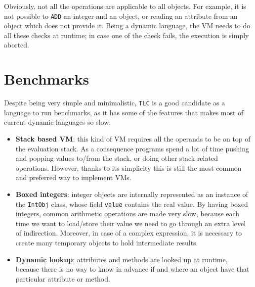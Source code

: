 Obviously, not all the operations are applicable to all objects. For example,
it is not possible to \lstinline{ADD} an integer and an object, or reading an
attribute from an object which does not provide it.  Being a dynamic language,
the VM needs to do all these checks at runtime; in case one of the check
fails, the execution is simply aborted.


\section{Benchmarks}


Despite being very simple and minimalistic, \lstinline{TLC} is a good
candidate as a language to run benchmarks, as it has some of the features that
makes most of current dynamic languages so slow:

\begin{itemize}

\item \textbf{Stack based VM}: this kind of VM requires all the operands to be
  on top of the evaluation stack.  As a consequence programs spend a lot of
  time pushing and popping values to/from the stack, or doing other stack
  related operations.  However, thanks to its simplicity this is still the
  most common and preferred way to implement VMs.

\item \textbf{Boxed integers}: integer objects are internally represented as
  an instance of the \lstinline{IntObj} class, whose field \lstinline{value}
  contains the real value.  By having boxed integers, common arithmetic
  operations are made very slow, because each time we want to load/store their
  value we need to go through an extra level of indirection.  Moreover, in
  case of a complex expression, it is necessary to create many temporary
  objects to hold intermediate results.

\item \textbf{Dynamic lookup}: attributes and methods are looked up at
  runtime, because there is no way to know in advance if and where an object
  have that particular attribute or method.
\end{itemize}

